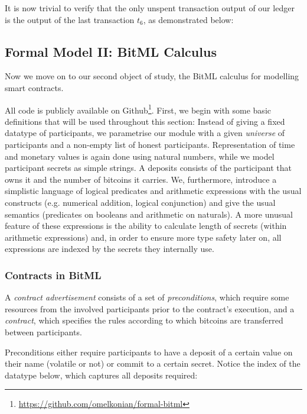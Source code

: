 \documentclass[acmsmall,nonacm=true,screen=true]{acmart}
\newcommand\site[1]{\footnote{\url{#1}}}
\begin{document}
It is now trivial to verify that the only unspent transaction output of our ledger is the output of the last
transaction $t_6$, as demonstrated below:
\UTXOexampleC{}

\subsection{Formal Model II: BitML Calculus} \label{subsec:bitml}
Now we move on to our second object of study, the BitML calculus for modelling smart contracts.

All code is publicly available on Github\site{https://github.com/omelkonian/formal-bitml}.
First, we begin with some basic definitions that will be used throughout this section:
\BITbasicTypes{}
Instead of giving a fixed datatype of participants, we parametrise our module with a given \textit{universe} of participants
and a non-empty list of honest participants.
Representation of time and monetary values is again done using natural numbers, while we model participant secrets as simple strings.
A deposits consists of the participant that owns it and the number of bitcoins it carries.
We, furthermore, introduce a simplistic language of logical predicates and arithmetic expressions with the usual constructs (e.g. numerical addition, logical conjunction) and give the usual semantics (predicates on booleans and arithmetic on naturals).
A more unusual feature of these expressions is the ability to calculate length of secrets (within arithmetic expressions)
and, in order to ensure more type safety later on, all expressions are indexed by the secrets they internally use.

\subsubsection{Contracts in BitML}
A \textit{contract advertisement} consists of a set of \textit{preconditions},
which require some resources from the involved participants prior to the contract's execution,
and a \textit{contract}, which specifies the rules according to which bitcoins are transferred between participants.

Preconditions either require participants to have a deposit of a certain value on their name (volatile or not) or 
commit to a certain secret. Notice the index of the datatype below, which captures all deposits required:
\BITpreconditions{}
\end{document}

